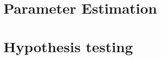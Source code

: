 \documentclass{amro-notes}
\begin{document}
\chapter{Parameter Estimation}


\chapter{Hypothesis testing}



\begin{appendices}
    
\end{appendices}






\printindex
\end{document}

